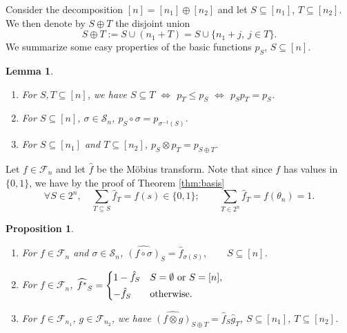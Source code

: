\documentclass[12pt]{article}
\newtheorem{lemma}{Lemma}
\newtheorem{prop}{Proposition}
\theoremstyle{definition}
\theoremstyle{remark}
\def\Fe{\mathcal F}
\def\permut{\mathscr{S}}
\begin{document}
Consider the decomposition $[n]=[n_1]\oplus [n_2]$ and let $S\subseteq [n_1]$,
$T\subseteq [n_2]$. We then denote by $S\oplus T$ the disjoint union 
\begin{equation}\label{eq:disu}
S\oplus T:=S\cup (n_1+T)=S\cup\{n_1+j,\ j\in T\}.
\end{equation}
We summarize some easy properties of the basic functions $p_S$, $S\subseteq [n]$.

\begin{lemma}\label{lemma:PSPT}
\begin{enumerate}
\item[(i)] For $S,T\subseteq [n]$, we have $S\subseteq T$ $\iff$ $p_T\le p_S$ $\iff$
$p_Sp_T=p_S$.
\item[(ii)] For $S\subseteq [n]$, $\sigma\in \permut_n$,
$p_S\circ\sigma=p_{\sigma^{-1}(S)}$.
\item[(iii)] For $S\subseteq [n_1]$ and $T\subseteq [n_2]$, $p_S\otimes p_T=p_{S\oplus T}$.

\end{enumerate}
\end{lemma}

Let $f\in \Fe_n$ and let $\hat f$ be the M\"obius transform. Note that since $f$ has
values in $\{0,1\}$, we have by the proof of Theorem \ref{thm:basis}
\[
\forall S\in 2^n, \quad \sum_{T\subseteq S} \hat f_T=f(s)\in \{0,1\}; \qquad \sum_{T\in 2^n} \hat
f_T=f(\theta_n)=1.
\]



\begin{prop}\label{prop:mobius} 

\begin{enumerate}
\item[(i)] For $f\in \Fe_n$ and  $\sigma\in \permut_n$, 
$\widehat{(f\circ \sigma)}_S=\hat f_{\sigma(S)}, \qquad S\subseteq [n]$.
\item[(ii)] For $f\in \Fe_n$, $\widehat{f^*}_S=\begin{dcases} 1-\hat f_S & S=\emptyset\text{ or } S=[n],\\
-\hat f_S & \text{otherwise}.
\end{dcases}$
\item[(iii)] For $f\in \Fe_{n_1}$, $g\in \Fe_{n_2}$, we have 
$\widehat{(f\otimes g)}_{S\oplus T}=\hat f_S\hat g_T$, $S\subseteq [n_1]$, $T\subseteq
[n_2]$.
%
\end{enumerate}


\end{prop}
\end{document}
